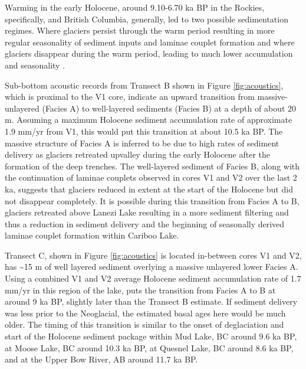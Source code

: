 \documentclass[Royal,times,doublespace,sageh]{sagej}
\begin{document}
Warming in the early Holocene, around 9.10-6.70 ka BP in the Rockies,
specifically, \citep{Luckman1986} and British Columbia, generally,
\citep{Clague1989} led to two possible sedimentation regimes. Where
glaciers persist through the warm period resulting in more regular
seasonality of sediment inputs and laminae couplet formation
\citep[e.g.~Mud Lake,][]{Hodder2006b} and where glaciers disappear
during the warm period, leading to much lower accumulation and
seasonality \citep[e.g.~Moose Lake,][]{Desloges1999}.

Sub-bottom acoustic records from Transect B shown in Figure
\ref{fig:acoustics}, which is proximal to the V1 core, indicate an
upward transition from massive-unlayered (Facies A) to well-layered
sediments (Facies B) at a depth of about 20 m. Assuming a maximum
Holocene sediment accumulation rate of approximate 1.9 mm/yr from V1,
this would put this transition at about 10.5 ka BP. The massive
structure of Facies A is inferred to be due to high rates of sediment
delivery as glaciers retreated upvalley during the early Holocene after
the formation of the deep trenches. The well-layered sediment of Facies
B, along with the continuation of laminae couplets observed in cores V1
and V2 over the last 2 ka, suggests that glaciers reduced in extent at
the start of the Holocene but did not disappear completely. It is
possible during this transition from Facies A to B, glaciers retreated
above Lanezi Lake resulting in a more sediment filtering and thus a
reduction in sediment delivery and the beginning of seasonally derived
laminae couplet formation within Cariboo Lake.

Transect C, shown in Figure \ref{fig:acoustics} is located in-between
cores V1 and V2, has \textasciitilde15 m of well layered sediment
overlying a massive unlayered lower Facies A. Using a combined V1 and V2
average Holocene sediment accumulation rate of 1.7 mm/yr in this region
of the lake, puts the transition from Facies A to B at around 9 ka BP,
slightly later than the Transect B estimate. If sediment delivery was
less prior to the Neoglacial, the estimated basal ages here would be
much older. The timing of this transition is similar to the onset of
deglaciation and start of the Holocene sediment package within Mud Lake,
BC \citep{Hodder2006b} around 9.6 ka BP, at Moose Lake, BC
\citep{Desloges1999} around 10.3 ka BP, at Quesnel Lake, BC
\citep{Gilbert2012} around 8.6 ka BP, and at the Upper Bow River, AB
\citep{Leonard1999} around 11.7 ka BP.
\end{document}
